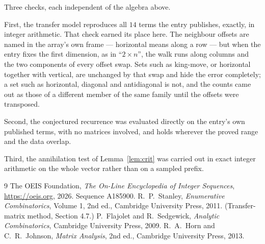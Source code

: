 \documentclass[11pt,a4paper]{article}
\theoremstyle{plain}
\theoremstyle{definition}
\begin{document}
Three checks, each independent of the algebra above.

First, the transfer model reproduces all $14$ terms the entry publishes, exactly, in
integer arithmetic. That check earned its place here. The neighbour offsets are named in the
array's own frame --- horizontal means along a row --- but when the entry fixes the first
dimension, as in ``$2\times n$'', the walk runs along columns and the two components of every
offset swap. Sets such as king-move, or horizontal together with vertical, are unchanged by
that swap and hide the error completely; a set such as horizontal, diagonal and antidiagonal
is not, and the counts came out as those of a different member of the same family until the
offsets were transposed.

Second, the conjectured recurrence was evaluated directly on the entry's own published terms,
with no matrices involved, and holds wherever the proved range and the data overlap.

Third, the annihilation test of Lemma~\ref{lem:crit} was carried out in exact integer
arithmetic on the whole vector rather than on a sampled prefix.

\begin{thebibliography}{9}
 The OEIS Foundation, \emph{The On-Line Encyclopedia of Integer
Sequences}, \url{https://oeis.org}, 2026. Sequence A185900.
 R.~P.~Stanley, \emph{Enumerative Combinatorics}, Volume 1, 2nd ed.,
Cambridge University Press, 2011. (Transfer-matrix method, Section 4.7.)
 P.~Flajolet and R.~Sedgewick, \emph{Analytic Combinatorics}, Cambridge
University Press, 2009.
 R.~A.~Horn and C.~R.~Johnson, \emph{Matrix Analysis}, 2nd ed., Cambridge
University Press, 2013.
\end{thebibliography}
\end{document}
